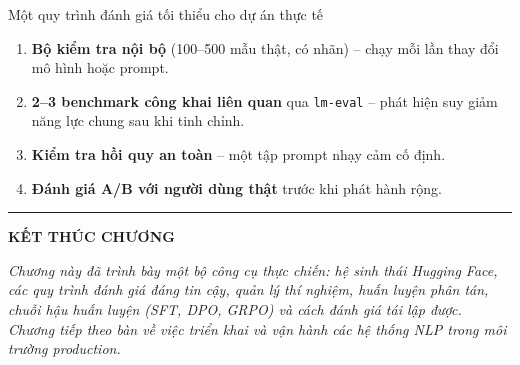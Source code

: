 \begin{checklist}{Một quy trình đánh giá tối thiểu cho dự án thực tế}
\begin{enumerate}
	\item \textbf{Bộ kiểm tra nội bộ} (100--500 mẫu thật, có nhãn) -- chạy mỗi lần thay đổi mô hình hoặc prompt.
	\item \textbf{2--3 benchmark công khai liên quan} qua \texttt{lm-eval} -- phát hiện suy giảm năng lực chung sau khi tinh chỉnh.
	\item \textbf{Kiểm tra hồi quy an toàn} -- một tập prompt nhạy cảm cố định.
	\item \textbf{Đánh giá A/B với người dùng thật} trước khi phát hành rộng.
\end{enumerate}
\end{checklist}

\bigskip
\hrule
\bigskip

\begin{center}
    \textbf{\Large KẾT THÚC CHƯƠNG \thechapter}
\end{center}

\textit{Chương này đã trình bày một bộ công cụ thực chiến: hệ sinh thái Hugging Face, các quy trình đánh giá đáng tin cậy, quản lý thí nghiệm, huấn luyện phân tán, chuỗi hậu huấn luyện (SFT, DPO, GRPO) và cách đánh giá tái lập được. Chương tiếp theo bàn về việc triển khai và vận hành các hệ thống NLP trong môi trường production.}
